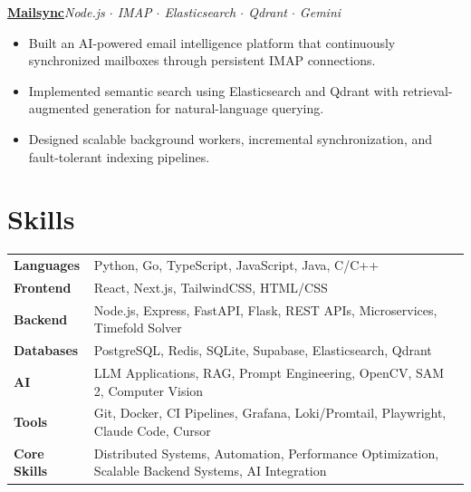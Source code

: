 \documentclass[10pt,a4paper]{article}
\newcommand{\entry}[2]{\textbf{#1}\hfill\textit{#2}\par}
\begin{document}
\entry{\href{https://github.com/rohiitgit/mailsync}{Mailsync}}{Node.js $\cdot$ IMAP $\cdot$ Elasticsearch $\cdot$ Qdrant $\cdot$ Gemini}
\begin{itemize}
\item Built an AI-powered email intelligence platform that continuously synchronized mailboxes through persistent IMAP connections.
\item Implemented semantic search using Elasticsearch and Qdrant with retrieval-augmented generation for natural-language querying.
\item Designed scalable background workers, incremental synchronization, and fault-tolerant indexing pipelines.
\end{itemize}

\section*{Skills}
\begin{tabularx}{\textwidth}{@{}l@{\hspace{12pt}}X@{}}
\textbf{Languages} & Python, Go, TypeScript, JavaScript, Java, C/C++ \\
\textbf{Frontend} & React, Next.js, TailwindCSS, HTML/CSS \\
\textbf{Backend} & Node.js, Express, FastAPI, Flask, REST APIs, Microservices, Timefold Solver \\
\textbf{Databases} & PostgreSQL, Redis, SQLite, Supabase, Elasticsearch, Qdrant \\
\textbf{AI} & LLM Applications, RAG, Prompt Engineering, OpenCV, SAM 2, Computer Vision \\
\textbf{Tools} & Git, Docker, CI Pipelines, Grafana, Loki/Promtail, Playwright, Claude Code, Cursor \\
\textbf{Core Skills} & Distributed Systems, Automation, Performance Optimization, Scalable Backend Systems, AI Integration \\
\end{tabularx}
\end{document}
